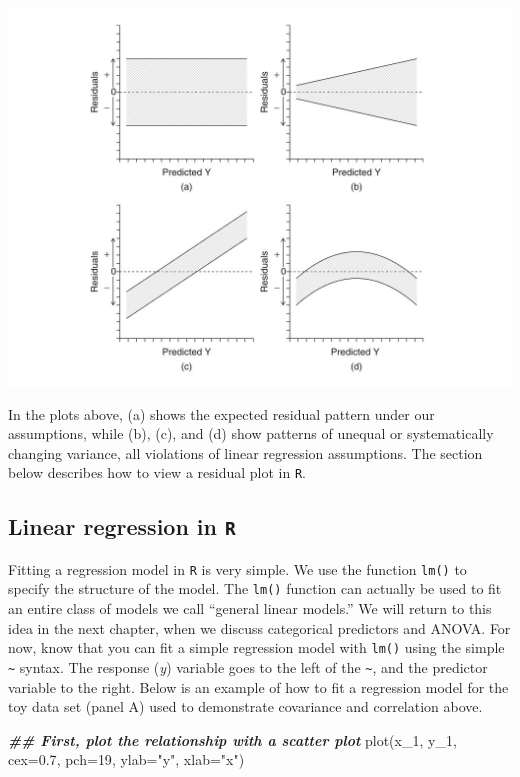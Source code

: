 \documentclass[
]{book}
\newenvironment{Shaded}{\begin{snugshade}}{\end{snugshade}}
\newcommand{\AttributeTok}[1]{\textcolor[rgb]{0.77,0.63,0.00}{#1}}
\newcommand{\DecValTok}[1]{\textcolor[rgb]{0.00,0.00,0.81}{#1}}
\newcommand{\DocumentationTok}[1]{\textcolor[rgb]{0.56,0.35,0.01}{\textbf{\textit{#1}}}}
\newcommand{\FloatTok}[1]{\textcolor[rgb]{0.00,0.00,0.81}{#1}}
\newcommand{\FunctionTok}[1]{\textcolor[rgb]{0.00,0.00,0.00}{#1}}
\newcommand{\NormalTok}[1]{#1}
\newcommand{\StringTok}[1]{\textcolor[rgb]{0.31,0.60,0.02}{#1}}
\begin{document}
\begin{center}\includegraphics[width=14.22in]{images/images_4b.018} \end{center}

In the plots above, (a) shows the expected residual pattern under our assumptions, while (b), (c), and (d) show patterns of unequal or systematically changing variance, all violations of linear regression assumptions. The section below describes how to view a residual plot in \texttt{R}.

\hypertarget{linear-regression-in-r}{%
\subsection{\texorpdfstring{Linear regression in \texttt{R}}{Linear regression in R}}\label{linear-regression-in-r}}

Fitting a regression model in \texttt{R} is very simple. We use the function \texttt{lm()} to specify the structure of the model. The \texttt{lm()} function can actually be used to fit an entire class of models we call ``general linear models.'' We will return to this idea in the next chapter, when we discuss categorical predictors and ANOVA. For now, know that you can fit a simple regression model with \texttt{lm()} using the simple \texttt{\textasciitilde{}} syntax. The response (\emph{y}) variable goes to the left of the \texttt{\textasciitilde{}}, and the predictor variable to the right. Below is an example of how to fit a regression model for the toy data set (panel A) used to demonstrate covariance and correlation above.

\begin{Shaded}
\begin{Highlighting}[]
\DocumentationTok{\#\# First, plot the relationship with a scatter plot}
\FunctionTok{plot}\NormalTok{(x\_1, y\_1, }\AttributeTok{cex=}\FloatTok{0.7}\NormalTok{, }\AttributeTok{pch=}\DecValTok{19}\NormalTok{, }\AttributeTok{ylab=}\StringTok{"y"}\NormalTok{, }\AttributeTok{xlab=}\StringTok{"x"}\NormalTok{)}
\end{Highlighting}
\end{Shaded}
\end{document}
